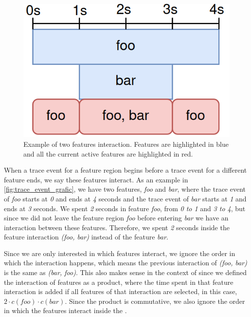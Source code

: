 \begin{figure}[h]
    \centering
    \includegraphics[scale=0.25]{gfx/trace_event_grafic.png}
    \caption{Example of two features interaction. Features are highlighted in blue and all the current active features are highlighted in red.}
    \label{fig:trace_event_grafic}
\end{figure}

When a trace event for a feature region begins before a trace event for a different feature ends, we say these features interact. 
As an example in \autoref{fig:trace_event_grafic}, we have two features, \emph{foo} and \emph{bar}, where the trace event of \emph{foo} starts at \emph{0} and ends at \emph{4} seconds 
and the trace event of \emph{bar} starts at \emph{1} and ends at \emph{3} seconds. We spent \emph{2} seconds in feature \emph{foo}, 
from \emph{0 to 1} and \emph{3 to 4}, 
but since we did not leave the feature region \emph{foo} before entering \emph{bar} we have an interaction between these features. 
Therefore, we spent \emph{2} seconds inside the feature interaction \emph{(foo, bar)} instead of the feature \emph{bar}.

Since we are only interested in which features interact, we ignore the order in which the interaction happens, which means the previous
interaction of \emph{(foo, bar)} is the same as \emph{(bar, foo)}. This also makes sense in the context of {\perfInfluenceModel} since we defined
the interaction of features as a product, where the time spent in that feature interaction is added if all features of that interaction are selected,
in this case, $2 \cdot c(foo) \cdot c(bar)$. Since the product is commutative, we also ignore the order in which the features interact inside the \perfInfluenceModel.

